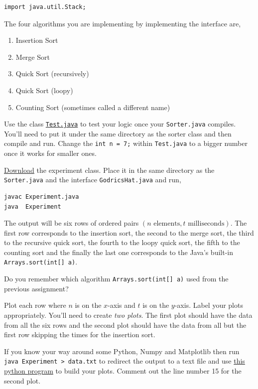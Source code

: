 \documentclass{homework}
\newcommand\download{\href{%
    https://tashfeen.org/s/ds/Experiment.java%
  }{Download}}
\begin{document}
\begin{verbatim}
import java.util.Stack;
\end{verbatim}

The four algorithms you are implementing by implementing the
interface are,

\begin{enumerate}
  \item Insertion Sort
  \item Merge Sort
  \item Quick Sort (recursively)
  \item Quick Sort (loopy)
  \item Counting Sort (sometimes called a different name)
\end{enumerate}

Use the class
\href{https://tashfeen.org/s/ds/Test.java}{\texttt{Test.java}}
to test your logic once your \texttt{Sorter.java} compiles. You'll
need to put it under the same directory as the sorter class and
then compile and run. Change the \texttt{int n = 7;} within
\texttt{Test.java} to a bigger number once it works for smaller
ones.

\question\label{plot} \download{} the experiment class. Place it in
the same directory as the \texttt{Sorter.java} and the interface
\texttt{GodricsHat.java} and run,
\begin{verbatim}
javac Experiment.java
java  Experiment
\end{verbatim}

The output will be six rows of ordered pairs $(n \text{ elements},
  t \text{ milliseconds})$. The first row corresponds to the
insertion sort, the second to the merge sort, the third to the
recursive quick sort, the fourth to the loopy quick sort, the
fifth to the counting sort and the finally the last one
corresponds to the Java's built-in \texttt{Arrays.sort(int[] a)}.

Do you remember which algorithm \texttt{Arrays.sort(int[] a)} used
from the previous assignment?

Plot each row where $n$ is on the $x$-axis and $t$ is on the
$y$-axis. Label your plots appropriately. You'll need to create
\textit{two plots}. The first plot should have the data from all
the six rows and the second plot should have the data from all but
the first row \ie skipping the times for the insertion sort.

If you know your way around some Python, Numpy and Matplotlib then
run \texttt{java Experiment > data.txt} to redirect the output to
a text file and use
\href{https://tashfeen.org/s/ds/plot.py}{this python
  program} to build your plots. Comment out the line number 15 for
the second plot.
\end{document}
